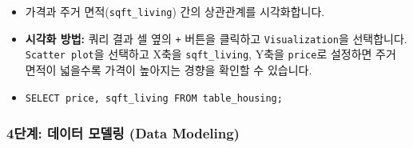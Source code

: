 \documentclass[11pt,a4paper]{article}
\theoremstyle{definition}
\newcommand{\code}[1]{\texttt{#1}}
\begin{document}
\begin{enumerate}
\begin{itemize}
        \item 가격과 주거 면적(\code{sqft_living}) 간의 상관관계를 시각화합니다.
        \item \textbf{시각화 방법:} 쿼리 결과 셀 옆의 \code{+} 버튼을 클릭하고 \code{Visualization}을 선택합니다. \code{Scatter plot}을 선택하고 X축을 \code{sqft_living}, Y축을 \code{price}로 설정하면 주거 면적이 넓을수록 가격이 높아지는 경향을 확인할 수 있습니다.
        \item 
        \begin{lstlisting}[caption=가격과 주거 면적 상관관계 쿼리]
%sql
SELECT price, sqft_living FROM table_housing;
        \end{lstlisting}
    \end{itemize}
\end{enumerate}

\subsubsection{4단계: 데이터 모델링 (Data Modeling)}
\end{document}
